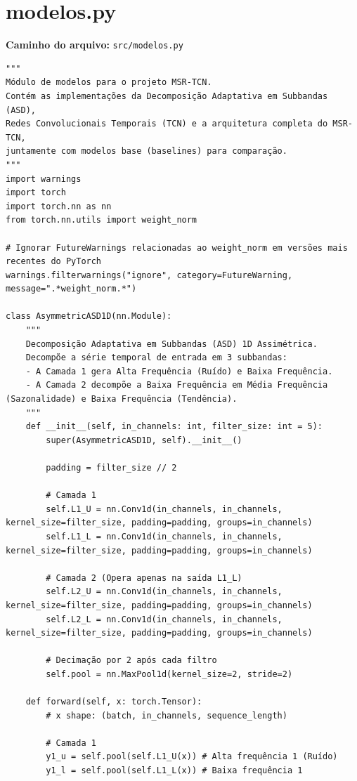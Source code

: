 \documentclass{article}
\begin{document}
\newpage

\section{modelos.py}
\textbf{Caminho do arquivo:} \texttt{src/modelos.py}

\begin{verbatim}
"""
Módulo de modelos para o projeto MSR-TCN.
Contém as implementações da Decomposição Adaptativa em Subbandas (ASD),
Redes Convolucionais Temporais (TCN) e a arquitetura completa do MSR-TCN,
juntamente com modelos base (baselines) para comparação.
"""
import warnings
import torch
import torch.nn as nn
from torch.nn.utils import weight_norm

# Ignorar FutureWarnings relacionadas ao weight_norm em versões mais recentes do PyTorch
warnings.filterwarnings("ignore", category=FutureWarning, message=".*weight_norm.*")

class AsymmetricASD1D(nn.Module):
    """
    Decomposição Adaptativa em Subbandas (ASD) 1D Assimétrica.
    Decompõe a série temporal de entrada em 3 subbandas:
    - A Camada 1 gera Alta Frequência (Ruído) e Baixa Frequência.
    - A Camada 2 decompõe a Baixa Frequência em Média Frequência (Sazonalidade) e Baixa Frequência (Tendência).
    """
    def __init__(self, in_channels: int, filter_size: int = 5):
        super(AsymmetricASD1D, self).__init__()
        
        padding = filter_size // 2
        
        # Camada 1
        self.L1_U = nn.Conv1d(in_channels, in_channels, kernel_size=filter_size, padding=padding, groups=in_channels)
        self.L1_L = nn.Conv1d(in_channels, in_channels, kernel_size=filter_size, padding=padding, groups=in_channels)
        
        # Camada 2 (Opera apenas na saída L1_L)
        self.L2_U = nn.Conv1d(in_channels, in_channels, kernel_size=filter_size, padding=padding, groups=in_channels)
        self.L2_L = nn.Conv1d(in_channels, in_channels, kernel_size=filter_size, padding=padding, groups=in_channels)
        
        # Decimação por 2 após cada filtro
        self.pool = nn.MaxPool1d(kernel_size=2, stride=2)
        
    def forward(self, x: torch.Tensor):
        # x shape: (batch, in_channels, sequence_length)
        
        # Camada 1
        y1_u = self.pool(self.L1_U(x)) # Alta frequência 1 (Ruído)
        y1_l = self.pool(self.L1_L(x)) # Baixa frequência 1
        

\end{verbatim}
\end{document}

